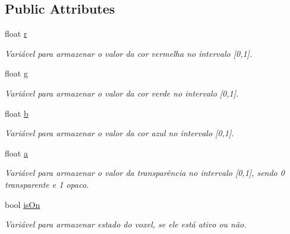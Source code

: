 \subsection*{Public Attributes}
\begin{DoxyCompactItemize}
\item 
\mbox{\label{struct_voxel_a06872ec79b836120b551a848968c0f1b}} 
float \mbox{\hyperlink{struct_voxel_a06872ec79b836120b551a848968c0f1b}{r}}
\begin{DoxyCompactList}\small\item\em Variável para armazenar o valor da cor vermelha no intervalo \mbox{[}0,1\mbox{]}. \end{DoxyCompactList}\item 
\mbox{\label{struct_voxel_a27c0da1ed2ff430401d23ff171612a73}} 
float \mbox{\hyperlink{struct_voxel_a27c0da1ed2ff430401d23ff171612a73}{g}}
\begin{DoxyCompactList}\small\item\em Variável para armazenar o valor da cor verde no intervalo \mbox{[}0,1\mbox{]}. \end{DoxyCompactList}\item 
\mbox{\label{struct_voxel_a5cd8432b1d7d0fd8b79e0fc7d10373a8}} 
float \mbox{\hyperlink{struct_voxel_a5cd8432b1d7d0fd8b79e0fc7d10373a8}{b}}
\begin{DoxyCompactList}\small\item\em Variável para armazenar o valor da cor azul no intervalo \mbox{[}0,1\mbox{]}. \end{DoxyCompactList}\item 
\mbox{\label{struct_voxel_a3ce2579eb0a9f09a07112ce7498a638e}} 
float \mbox{\hyperlink{struct_voxel_a3ce2579eb0a9f09a07112ce7498a638e}{a}}
\begin{DoxyCompactList}\small\item\em Variável para armazenar o valor da transparência no intervalo \mbox{[}0,1\mbox{]}, sendo 0 transparente e 1 opaco. \end{DoxyCompactList}\item 
\mbox{\label{struct_voxel_a6fbe8bd53f64685ac4210726d40fc775}} 
bool \mbox{\hyperlink{struct_voxel_a6fbe8bd53f64685ac4210726d40fc775}{is\+On}}
\begin{DoxyCompactList}\small\item\em Variável para armazenar estado do voxel, se ele está ativo ou não. \end{DoxyCompactList}\end{DoxyCompactItemize}


